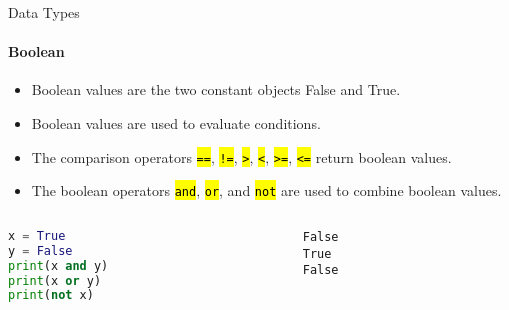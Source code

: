 \documentclass[
    aspectratio=169, 
    usepdftitle=false, 
    xcolor={dvipsnames},
    hyperref={
        colorlinks,
        linkcolor=black,
        urlcolor=blue}
    ]{beamer}
\let\OldTexttt\texttt
\renewcommand{\texttt}[1]{\OldTexttt{\hl{#1}}}%
\begin{document}
\begin{frame}[fragile]{Data Types}
    \framesubtitle{Boolean}
    \begin{itemize}
        \item Boolean values are the two constant objects False and True.
        \item Boolean values are used to evaluate conditions.
        \item The comparison operators \texttt{==}, \texttt{!=}, \texttt{>}, \texttt{<}, \texttt{>=}, \texttt{<=} return boolean values.
        \item The boolean operators \texttt{and}, \texttt{or}, and \texttt{not} are used to combine boolean values.
    \end{itemize}
    \begin{columns}
        \begin{column}{0.5\textwidth}
            \begin{lstlisting}[language=Python]
x = True
y = False
print(x and y)
print(x or y)
print(not x)
\end{lstlisting}
        \end{column}
        \begin{column}{0.4\textwidth}
\begin{lstlisting}[style=output]
False
True
False
\end{lstlisting}
        \end{column}
    \end{columns}
\end{frame}
\end{document}
